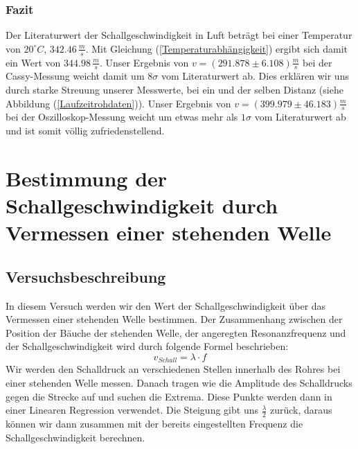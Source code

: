 \documentclass[12pt,a4paper]{article}
\begin{document}
\subsubsection{Fazit}
Der Literaturwert der Schallgeschwindigkeit in Luft beträgt bei einer Temperatur von $20^{\circ}C$, $342.46\, \frac{m}{s}$. Mit Gleichung (\ref{Temperaturabhängigkeit}) ergibt sich damit ein Wert von $344.98 \, \frac{m}{s}$.
Unser Ergebnis von $v=(291.878 \pm 6.108) \frac{m}{s}$ bei der Cassy-Messung weicht damit um $8\sigma$ vom Literaturwert ab. Dies erklären wir uns durch starke Streuung unserer Messwerte, bei ein und der selben Distanz (siehe Abbildung (\ref{Laufzeitrohdaten})). \newline
Unser Ergebnis von $v=(399.979 \pm 46.183)\frac{m}{s}$ bei der Oszilloskop-Messung weicht um etwas mehr als $1\sigma$ vom Literaturwert ab und ist somit völlig zufriedenstellend.
\section{Bestimmung der Schallgeschwindigkeit durch Vermessen einer stehenden Welle}
\subsection{Versuchsbeschreibung}
In diesem Versuch werden wir den Wert der Schallgeschwindigkeit über das Vermessen einer stehenden Welle bestimmen. Der Zusammenhang zwischen der Position der Bäuche der stehenden Welle, der angeregten Resonanzfrequenz und der Schallgeschwindigkeit wird durch folgende Formel beschrieben:
\begin{equation}
v_{Schall} = \lambda\cdot f
\end{equation}
Wir werden den Schalldruck an verschiedenen Stellen innerhalb des Rohres bei einer stehenden Welle messen. Danach tragen wie die Amplitude des Schalldrucks gegen die Strecke auf und suchen die Extrema. Diese Punkte werden dann in einer Linearen Regression verwendet. Die Steigung gibt uns $\frac{\lambda}{2}$ zurück, daraus können wir dann zusammen mit der bereits eingestellten Frequenz die Schallgeschwindigkeit berechnen.
\end{document}
